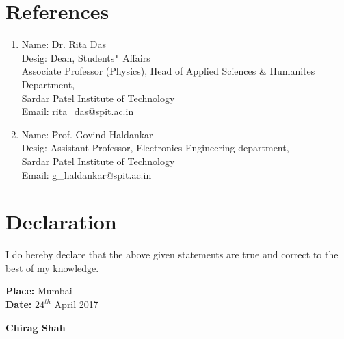 \documentclass{article}
\newcommand\tab[1][1cm]{\hspace*{#1}}
\begin{document}
	\section*{References}
	\begin{enumerate}
		\item
		\begin{tabbing}
			Name: 		 \=Dr. Rita Das\\ 
			Desig: \>Dean, Students\verb|'| Affairs\\
			\>Associate Professor (Physics), Head of Applied Sciences \& Humanites Department,\\
			\>Sardar Patel Institute of Technology\\
			Email: \>rita\_das@spit.ac.in\\ 
		\end{tabbing}
		
		\item
		\begin{tabbing}
			Name: 	 \=Prof. Govind Haldankar\\
			Desig:
			\>Assistant Professor, Electronics Engineering department,\\
			\>Sardar Patel Institute of Technology\\  
			Email: \>g\_haldankar@spit.ac.in\\ 
		\end{tabbing}	
		
	\end{enumerate}
	
	\section*{Declaration}
	\tab I do hereby declare that the above given statements are true and correct to the best of my knowledge.\\
	
	\vspace{2cm} 
	\noindent \parbox[t]{0.7\linewidth}
	{
		\textbf{Place:} Mumbai\\
		\textbf{Date:} $24^{th}$ April 2017	
	}	 
	\vspace{0.15cm}
	\parbox[t]{0.45\linewidth}
	{
		\vspace{0.15cm}
		\textbf{Chirag Shah}
	}
	
\end{document}
